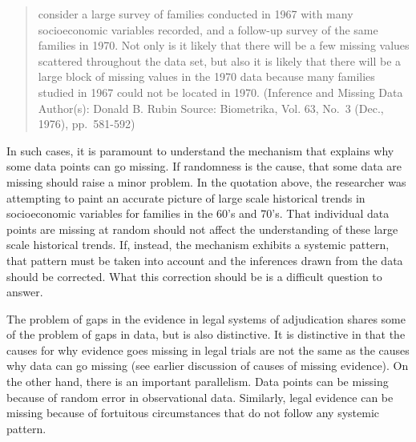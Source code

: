 \documentclass[
  10pt,
  dvipsnames,enabledeprecatedfontcommands]{scrartcl}
\begin{document}
\begin{quote}
consider a large survey of families conducted in 1967 with many
socioeconomic variables recorded, and a follow-up survey of the same
families in 1970. Not only is it likely that there will be a few missing
values scattered throughout the data set, but also it is likely that
there will be a large block of missing values in the 1970 data because
many families studied in 1967 could not be located in 1970. (Inference
and Missing Data Author(s): Donald B. Rubin Source: Biometrika, Vol. 63,
No.~3 (Dec., 1976), pp.~581-592)
\end{quote}

In such cases, it is paramount to understand the mechanism that explains
why some data points can go missing. If randomness is the cause, that
some data are missing should raise a minor problem. In the quotation
above, the researcher was attempting to paint an accurate picture of
large scale historical trends in socioeconomic variables for families in
the 60's and 70's. That individual data points are missing at random
should not affect the understanding of these large scale historical
trends. If, instead, the mechanism exhibits a systemic pattern, that
pattern must be taken into account and the inferences drawn from the
data should be corrected. What this correction should be is a difficult
question to answer.

The problem of gaps in the evidence in legal systems of adjudication
shares some of the problem of gaps in data, but is also distinctive. It
is distinctive in that the causes for why evidence goes missing in legal
trials are not the same as the causes why data can go missing (see
earlier discussion of causes of missing evidence). On the other hand,
there is an important parallelism. Data points can be missing because of
random error in observational data. Similarly, legal evidence can be
missing because of fortuitous circumstances that do not follow any
systemic pattern.
\end{document}
